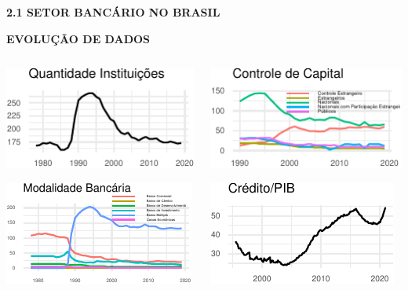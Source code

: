 \documentclass[ignorenonframetext,aspectratio=169,ignorenonframetext]{beamer}
\begin{document}
\begin{frame}{\textbf{2.1 SETOR BANCÁRIO NO BRASIL}}
\protect\hypertarget{setor-bancuxe1rio-no-brasil-1}{}

\textbf{EVOLUÇÃO DE DADOS}

\begin{columns}[T]
\begin{column}{0.33333\textwidth}
\begin{center}\includegraphics{01-presentation-V1_files/figure-beamer/count.banks-1} \end{center}

\begin{center}\includegraphics{01-presentation-V1_files/figure-beamer/kind.banks-1} \end{center}
\end{column}

\begin{column}{0.33333\textwidth}
\begin{center}\includegraphics{01-presentation-V1_files/figure-beamer/control.banks-1} \end{center}

\begin{center}\includegraphics{01-presentation-V1_files/figure-beamer/credit.pib-1} \end{center}
\end{column}


\end{columns}
\end{frame}
\end{document}
